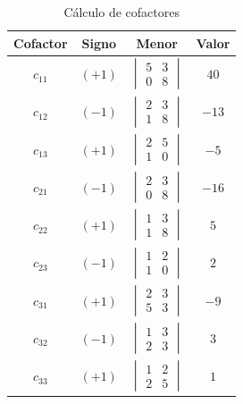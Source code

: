 \begin{example}
\begin{myproof}
\begin{table}[H]
\centering
\begin{tabular}{|c|c|c|c|}
\hline
\textbf{Cofactor} & \textbf{Signo} & \textbf{Menor} & \textbf{Valor} \\
\hline
$c_{11}$ & $(+1)$ & $\begin{vmatrix} 5 & 3 \\ 0 & 8 \end{vmatrix}$ & $40$ \\
\hline
$c_{12}$ & $(-1)$ & $\begin{vmatrix} 2 & 3 \\ 1 & 8 \end{vmatrix}$ & $-13$ \\
\hline
$c_{13}$ & $(+1)$ & $\begin{vmatrix} 2 & 5 \\ 1 & 0 \end{vmatrix}$ & $-5$ \\
\hline
$c_{21}$ & $(-1)$ & $\begin{vmatrix} 2 & 3 \\ 0 & 8 \end{vmatrix}$ & $-16$ \\
\hline
$c_{22}$ & $(+1)$ & $\begin{vmatrix} 1 & 3 \\ 1 & 8 \end{vmatrix}$ & $5$ \\
\hline
$c_{23}$ & $(-1)$ & $\begin{vmatrix} 1 & 2 \\ 1 & 0 \end{vmatrix}$ & $2$ \\
\hline
$c_{31}$ & $(+1)$ & $\begin{vmatrix} 2 & 3 \\ 5 & 3 \end{vmatrix}$ & $-9$ \\
\hline
$c_{32}$ & $(-1)$ & $\begin{vmatrix} 1 & 3 \\ 2 & 3 \end{vmatrix}$ & $3$ \\
\hline
$c_{33}$ & $(+1)$ & $\begin{vmatrix} 1 & 2 \\ 2 & 5 \end{vmatrix}$ & $1$ \\
\hline
\end{tabular}
\caption{Cálculo de cofactores}
\label{tab:cofactores}
\end{table}


\end{myproof}
\end{example}
